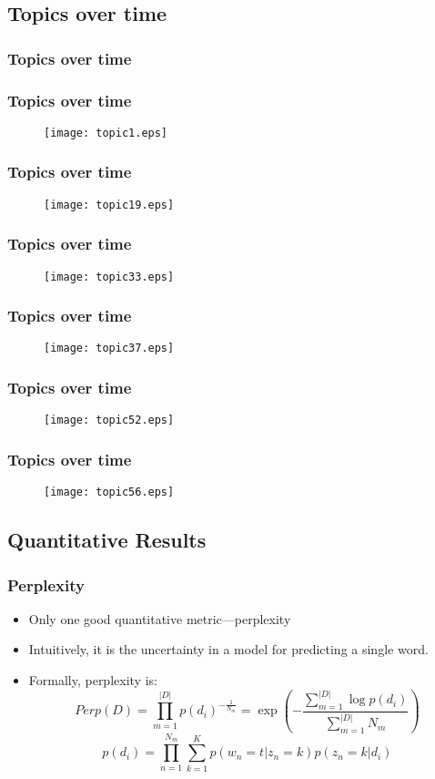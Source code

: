 \documentclass{beamer}
\begin{document}
\subsection{Topics over time}

\begin{frame}
  \frametitle{Topics over time}
\end{frame}

\begin{frame}
  \frametitle{Topics over time}
  \begin{figure}
	\texttt{[image: topic1.eps]}
  \end{figure}
\end{frame}
\begin{frame}
  \frametitle{Topics over time}
  \begin{figure}
	\texttt{[image: topic19.eps]}
  \end{figure}
\end{frame}
\begin{frame}
  \frametitle{Topics over time}
  \begin{figure}
	\texttt{[image: topic33.eps]}
  \end{figure}
\end{frame}
\begin{frame}
  \frametitle{Topics over time}
  \begin{figure}
	\texttt{[image: topic37.eps]}
  \end{figure}
\end{frame}
\begin{frame}
  \frametitle{Topics over time}
  \begin{figure}
	\texttt{[image: topic52.eps]}
  \end{figure}
\end{frame}
\begin{frame}
  \frametitle{Topics over time}
  \begin{figure}
	\texttt{[image: topic56.eps]}
  \end{figure}
\end{frame}

\subsection{Quantitative Results}

\begin{frame}
  \frametitle{Perplexity}
  \begin{itemize}
	\item Only one good quantitative metric---perplexity
	  \pause
	\item Intuitively, it is the uncertainty in a model for predicting a single
	  word.
	  \pause
	\item Formally, perplexity is:
	  \[Perp(D) = \prod_{m=1}^{|D|}p(d_i)^{-\frac{1}{N_m}}
	  = \exp\left(-\frac{\sum_{m=1}^{|D|}\log p(d_i)}{\sum_{m=1}^{|D|}N_m}
	  \right)\]
	  \[p(d_i) = \prod_{n=1}^{N_m}\sum_{k=1}^{K}p(w_n=t|z_n=k)p(z_n=k|d_i)\]
  \end{itemize}
\end{frame}
\end{document}
